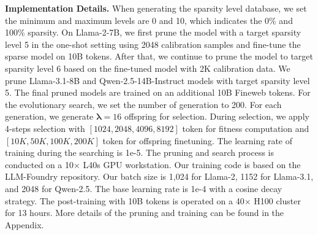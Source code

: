 \noindent \textbf{Implementation Details.} When generating the sparsity level database, we set the minimum and maximum levels are 0 and 10, which indicates the 0\% and 100\% sparsity. On Llama-2-7B, we first prune the model with a target sparsity level 5 in the one-shot setting using 2048 calibration samples and fine-tune the sparse model on 10B tokens. After that, we continue to prune the model to target sparsity level 6 based on the fine-tuned model with 2K calibration data. We prune Llama-3.1-8B and Qwen-2.5-14B-Instruct models with target sparsity level 5. The final pruned models are trained on an additional 10B Fineweb tokens. For the evolutionary search, we set the number of generation to 200. For each generation, we generate $\bm \lambda = 16$ offspring for selection. During selection, we apply 4-steps selection with $[1024, 2048, 4096, 8192]$ token for fitness computation and $[10K, 50K, 100K, 200K]$ token for offspring finetuning. The learning rate of training during the searching is 1e-5. The pruning and search process is conducted on a 10$\times$ L40s GPU workstation. Our training code is based on the LLM-Foundry repository. Our batch size is 1,024 for Llama-2, 1152 for Llama-3.1, and 2048 for Qwen-2.5. The base learning rate is 1e-4 with a cosine decay strategy. The post-training with 10B tokens is operated on a 40$\times$ H100 cluster for 13 hours. More details of the pruning and training can be found in the Appendix.



    
    
